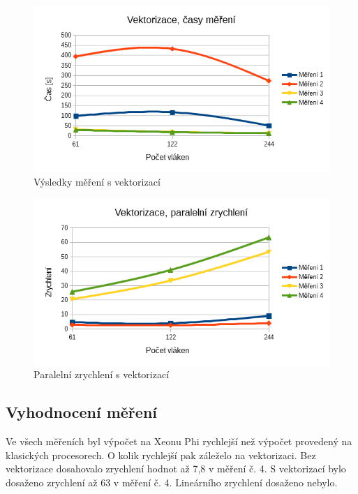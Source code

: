 \documentclass[12pt]{article}
\begin{document}
%
%
\begin{figure}[H]
  \begin{center}
      \includegraphics[width=12cm]{images/sdruzene/phi/vectime.png}	
    \caption{Výsledky měření s vektorizací}
  \end{center}
\end{figure}
%
%
\begin{figure}[H]
  \begin{center}
      \includegraphics[width=12cm]{images/sdruzene/phi/vecacc.png}	
    \caption{Paralelní zrychlení s vektorizací}
  \end{center}
\end{figure}

\subsection{Vyhodnocení měření}
Ve všech měřeních byl výpočet na Xeonu Phi rychlejší než výpočet provedený na klasických procesorech.
O kolik rychlejší pak záleželo na vektorizaci.
Bez vektorizace dosahovalo zrychlení hodnot až 7,8 v měření č. 4.
S vektorizací bylo dosaženo zrychlení až 63 v měření č. 4.
Lineárního zrychlení dosaženo nebylo.
\end{document}
